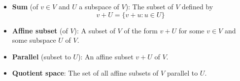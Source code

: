 \documentclass[../main.tex]{subfiles}
\begin{document}
\begin{itemize}
\begin{theorem}
\begin{proof}
\begin{align*}
                &= \dim U_1+\cdots+\dim U_m\tag*{Theorem \ref{trm:dimensionProduct}}
            \end{align*}
            as desired.\par
            The proof is symmetric in the other direction.
        \end{proof}
    \end{theorem}
    \item \textbf{Sum} (of $v\in V$ and $U$ a subspace of $V$): The subset of $V$ defined by
    \begin{equation*}
        v+U = \{v+u:u\in U\}
    \end{equation*}
    \item \textbf{Affine subset} (of $V$): A subset of $V$ of the form $v+U$ for some $v\in V$ and some subspace $U$ of $V$.
    \item \textbf{Parallel} (subset to $U$): An affine subset $v+U$ of $V$.
    \item \textbf{Quotient space}: The set of all affine subsets of $V$ parallel to $U$.
    \begin{figure}[H]
        \centering
\end{figure}
\end{itemize}
\end{document}
